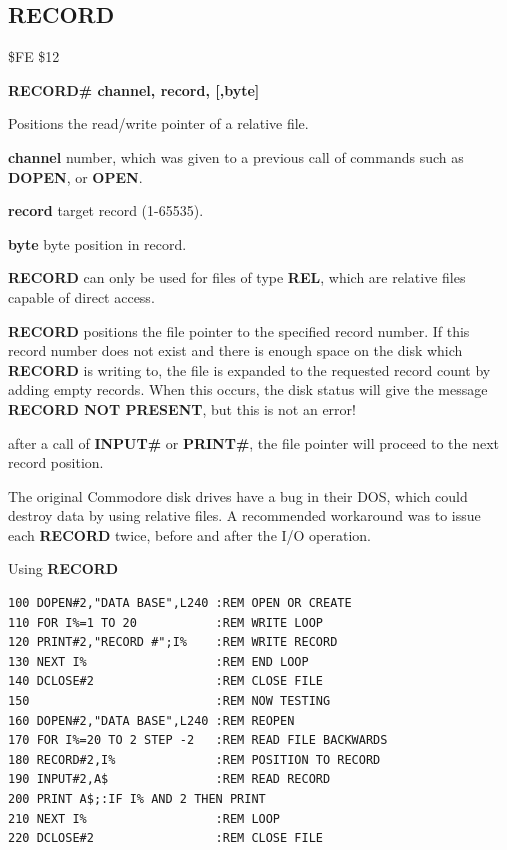 
\newpage
\subsection{RECORD}
\begin{description}[leftmargin=2cm,style=nextline]
\item [Token:] \$FE \$12
\item [Format:] {\bf RECORD\# channel, record, [,byte]}
\item [Usage:]  Positions the read/write pointer of a relative file.

                {\bf channel} number, which was given to a previous
                call of commands such as {\bf DOPEN}, or {\bf OPEN}.

                {\bf record} target record (1-65535).

                {\bf byte} byte position in record.

                {\bf RECORD} can only be used for files of
                type {\bf REL}, which are relative files capable
                of direct access.

               {\bf RECORD} positions the file pointer
               to the specified record number. If this record number
               does not exist and there is enough space on the disk
               which {\bf RECORD} is writing to,
               the file is expanded to the requested record count by adding
               empty records. When this occurs, the disk
               status will give the message {\bf RECORD NOT PRESENT}, but
               this is not an error!

               after a call of {\bf INPUT\#} or {\bf PRINT\#}, the file pointer will proceed
               to the next record position.

\item [Remarks:] The original Commodore disk drives have a bug
               in their DOS, which could destroy data by using
               relative files. A recommended workaround was to
               issue each {\bf RECORD} twice, before
               and after the I/O operation.

\item [Example:] Using {\bf RECORD}
\begin{tcolorbox}[colback=black,coltext=white]
\verbatimfont{\codefont}
\begin{verbatim}
100 DOPEN#2,"DATA BASE",L240 :REM OPEN OR CREATE
110 FOR I%=1 TO 20           :REM WRITE LOOP
120 PRINT#2,"RECORD #";I%    :REM WRITE RECORD
130 NEXT I%                  :REM END LOOP
140 DCLOSE#2                 :REM CLOSE FILE
150                          :REM NOW TESTING
160 DOPEN#2,"DATA BASE",L240 :REM REOPEN
170 FOR I%=20 TO 2 STEP -2   :REM READ FILE BACKWARDS
180 RECORD#2,I%              :REM POSITION TO RECORD
190 INPUT#2,A$               :REM READ RECORD
200 PRINT A$;:IF I% AND 2 THEN PRINT
210 NEXT I%                  :REM LOOP
220 DCLOSE#2                 :REM CLOSE FILE


\end{verbatim}
\end{tcolorbox}
\end{description}
